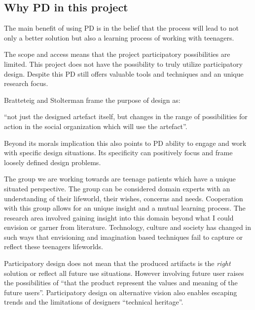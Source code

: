 \documentclass[UKenglish]{uiophd}
\begin{document}
	\subsection{Why PD in this project}
		The main benefit of using PD is in the belief that the process will lead to not only a better solution but also a learning process of working with teenagers.

		The scope and access means that the project participatory possibilities are limited. This project does not have the possibility to truly utilize participatory design. Despite this PD still offers valuable tools and techniques and an unique research focus. 


		Bratteteig and Stolterman frame the purpose of design as:

		``not just the designed artefact itself, but changes in the range of possibilities for action in the social organization which will use the artefact''\cite[p.~4]{Bratteteig1997Design}.

		Beyond its morals implication this also points to PD ability to engage and work with specific design situations. Its specificity can positively focus and frame loosely defined design problems.  

		The group we are working towards are teenage patients which have a unique situated perspective. The group can be considered domain experts with an understanding of their lifeworld, their wishes, concerns and needs. Cooperation with this group allows for an unique insight and a mutual learning process. The research area involved gaining insight into this domain beyond what I could envision or garner from literature. Technology, culture and society has changed in such ways that envisioning and imagination based techniques fail to capture or reflect these teenagers lifeworlds. 

		Participatory design does not mean that the produced artifacts is the \textit{right} solution or reflect all future use situations. However involving future user raises the possibilities of ``that the product represent the values and meaning of the future users''\cite[p.3]{Velden2014Participatory}. Participatory design on alternative vision also enables escaping trends and the limitations of designers ``technical heritage''\cite{Feng2008Thinking}. 
\end{document}
